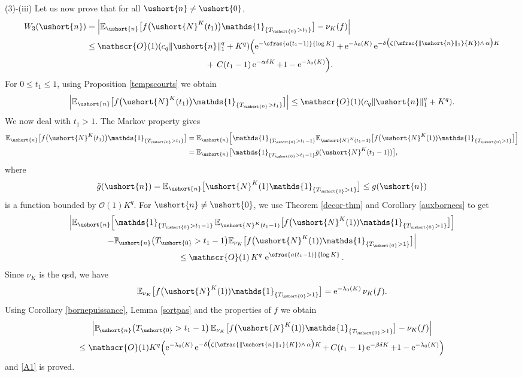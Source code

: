\documentclass[JEP,XML,SOM,Unicode]{cedram}
\newcommand{\Psfrac}[2]{(\sfrac{#1}{#2})}
\let\mathcal\mathscr
\numberwithin{equation}{section}
\theoremstyle{plain}
\theoremstyle{definition}
\newcommand{\proba}{{\mathbb{P}}}
\newcommand{\E}{{\mathbb{E}}}
\newcommand{\Oun}{\mathcal{O}(1)}
\newcommand{\un}{\mathds{1}}
\newcommand{\vecn}{\ushort{n}}
\newcommand{\veczer}{\ushort{0}}
\newcommand{\leproc}{\ushort{N}^{K}}
\newcommand{\sleproc}{\ushort{N}^{K}}
\newcommand{\nuk}{\nu_{K}}\let\snuk\nuk
\newcommand{\e}{\operatorname{e}}
\newcommand{\norm}[1]{\|#1\|_{1}}\let\snorm\norm
\begin{document}
(3)-(iii) Let us now prove that for all $\vecn\neq \veczer$,
\begin{equation}
\label{A1}
\begin{split}
W_{3}(\vecn)
&= \left|\E_{\vecn}\bigl[f\bigl(\leproc(t_{1})\bigr)\un_{\{T_{\veczer}>t_{1}\}}\bigr]-\nuk(f)\right| \\
& \leq \Oun (c_q \norm{\vecn}^{q} + K^q)\Bigl(\e^{-\sfrac{a (t_{1}-1)}{\log K}} + \e^{-\lambda_0(K)}
\e^{-\delta\bigl(\zeta\Psfrac{\|\vecn\|_{1}}{K}\wedge\, \alpha \bigr)K} \\
& \hspace*{5cm} + \,C(t_1-1)\e^{-\alpha\delta K}+1-\e^{-\lambda_0(K)}\Bigr).
\end{split}
\end{equation}
For $0\leq t_1\leq 1$, using Proposition \ref{tempscourts} we obtain
\[
\left|
\E_{\vecn}\bigl[f\bigl(\leproc(t_{1})\bigr)\un_{\{T_{\veczer}>t_{1}\}}\bigr]\right|
\leq \Oun (c_q\norm{\vecn}^{q} + K^q).
\]
We now deal with $t_1>1$.
The Markov property gives
\begin{align*}
\E_{\vecn}\bigl[f\bigl(\leproc(t_{1})\bigr)\un_{\{T_{\veczer}>t_{1}\}}\bigr]
& = \E_{\vecn}\Bigl[\un_{\{T_{\veczer}>t_{1}-1\}}
\E_{\sleproc(t_{1}-1)}\bigl[f\bigl(\leproc(1)) \un_{\{T_{\veczer}>1\}}\bigr]\Bigr]\\
& = \E_{\vecn}\bigl[\un_{\{T_{\veczer}>t_{1}-1\}}
\tilde g(\leproc(t_{1}-1))\bigr],
\end{align*}
where
\[
\tilde g (\vecn) = \E_{\vecn}\bigl[\leproc(1) \un_{\{T_{\veczer}>1\}}\bigr] \leq g(\vecn)
\]
is a function bounded by $\Oun K^q$.
For $\vecn\neq \veczer$, we use Theorem \ref{decor-thm} and Corollary \ref{auxbornees} to get
\begin{multline*}
\Big|
\E_{\vecn}\Bigl[\un_{\{T_{\veczer}>t_{1}-1\}}\,
\E_{\sleproc(t_{1}-1)}\bigl[f\bigl(\leproc(1)) \un_{\{T_{\veczer}>1\}}\bigr]
\Bigr] \\
-\proba_{\!\vecn}\bigl(T_{\veczer}>t_1-1\bigr) \E_{\snuk}\bigl[f\bigl(\leproc(1)) \un_{\{T_{\veczer}>1\}}\bigr]
\Big| \\
\leq\Oun\, K^q\, \e^{\sfrac{a(t_{1}-1)}{\log K}}.
\end{multline*}
Since $\nuk$ is the qsd, we have
\[
\E_{\snuk}\bigl[f\bigl(\leproc(1)) \un_{\{T_{\veczer}>1\}}\bigr]= \e^{-\lambda_0(K)} \nuk(f).
\]
Using Corollary \ref{bornepuissance}, Lemma \ref{sortpas} and the properties of $f$ we obtain
\begin{multline*}
\left|\proba_{\!\vecn}\bigl(T_{\veczer}>t_1-1\bigr)\, \E_{\snuk}\bigl[f\bigl(\leproc(1)) \un_{\{T_{\veczer}>1\}}\bigr]
-\nuk(f)\right|\\
\leq \Oun K^q\Bigl(\e^{-\lambda_0(K)}\e^{-\delta\bigl(\zeta\Psfrac{\|\vecn\|_{1}}{K}\wedge\, \alpha \bigr)K} +\, C(t_1-1)\e^{-\beta\delta K}+
1-\e^{-\lambda_0(K)}\Bigr)
\end{multline*}
and \eqref{A1} is proved.
\end{document}
